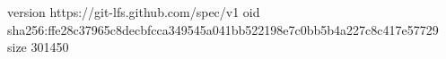 version https://git-lfs.github.com/spec/v1
oid sha256:ffe28c37965c8decbfcca349545a041bb522198e7c0bb5b4a227c8c417e57729
size 301450
